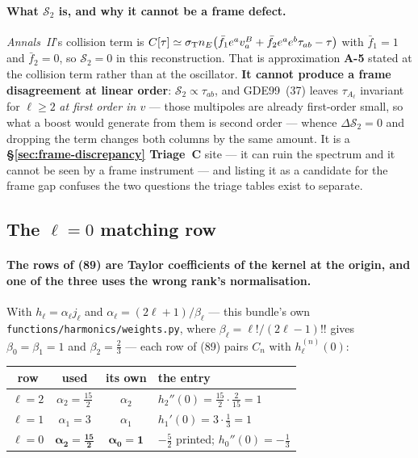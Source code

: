 \paragraph{What $\mathcal S_2$ is, and why it cannot be a frame defect.}
\emph{Annals~II}'s collision term is
$C[\tau]\simeq\sigma_{\rm T}n_E\big(\bar f_1e^av^B_a
+\bar f_2e^ae^b\tau_{ab}-\tau\big)$ with $\bar f_1=1$ and
$\bar f_2=0$, so $\mathcal S_2=0$ in this reconstruction. That is
approximation \textbf{A-5} stated at the collision term rather than at the
oscillator. \textbf{It cannot produce a frame disagreement at linear order}:
$\mathcal S_2\propto\tau_{ab}$, and GDE99~(37) leaves $\tau_{A_\ell}$ invariant
for $\ell\ge2$ \emph{at first order in $v$} --- those multipoles are already
first-order small, so what a boost would generate from them is second order ---
whence $\Delta\mathcal S_2=0$ and dropping the term changes both columns by the
same amount. It is a \textbf{\S\ref{sec:frame-discrepancy} Triage~C} site ---
it can ruin the spectrum and it cannot be seen by a frame instrument --- and
listing it as a candidate for the frame gap confuses the two questions the
triage tables exist to separate.

\subsection{The $\ell=0$ matching row}
\label{sec:ell-zero-row}

\paragraph{The rows of (89) are Taylor coefficients of the kernel at the
origin, and one of the three uses the wrong rank's normalisation.}
With $h_\ell=\alpha_\ell j_\ell$ and
$\alpha_\ell=(2\ell+1)/\beta_\ell$ --- this bundle's own
\texttt{functions/harmonics/weights.py}, where
$\beta_\ell=\ell!/(2\ell-1)!!$ gives $\beta_0=\beta_1=1$ and
$\beta_2=\tfrac23$ --- each row of (89) pairs $C_n$ with
$h_\ell^{(n)}(0)$:

\begin{center}\small
\begin{tabular}{@{}cccl@{}}
\toprule
row & used & its own & the entry \\
\midrule
$\ell=2$ & $\alpha_2=\tfrac{15}2$ & $\alpha_2$ &
  $h_2''(0)=\tfrac{15}2\cdot\tfrac2{15}=1$ \\
$\ell=1$ & $\alpha_1=3$ & $\alpha_1$ &
  $h_1'(0)=3\cdot\tfrac13=1$ \\
$\ell=0$ & $\boldsymbol{\alpha_2=\tfrac{15}2}$ & $\boldsymbol{\alpha_0=1}$ &
  $-\tfrac52$ printed; $h_0''(0)=-\tfrac13$ \\
\bottomrule
\end{tabular}
\end{center}

